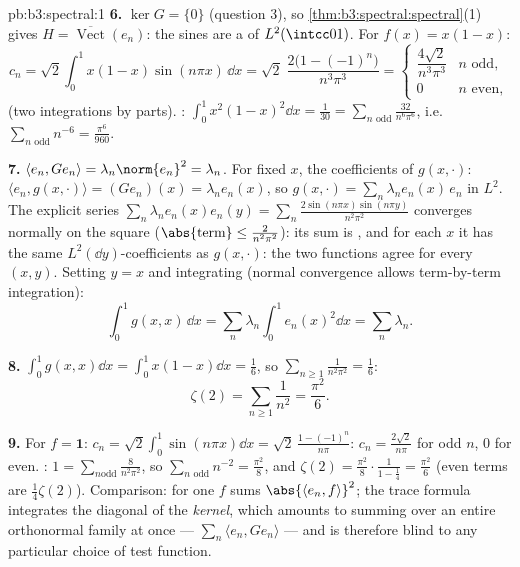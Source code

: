 \begin{solution}{pb:b3:spectral:1}
\textbf{6.} $\ker G = \{0\}$ (question 3), so
\cref{thm:b3:spectral:spectral}(1) gives $H =
\overline{\operatorname{Vect}}(e_n)$: the sines are a  of $L^2(\intcc01)$. For $f(x) = x(1 - x)$:
\[
c_n = \sqrt2\int_0^1x(1-x)\sin(n\pi x)\,\dd x
= \sqrt2\;\frac{2\bigl(1 - (-1)^n\bigr)}{n^3\pi^3}
= \begin{cases}\dfrac{4\sqrt2}{n^3\pi^3} & n \text{ odd},\\
0 & n \text{ even},\end{cases}
\]
(two integrations by parts). : $\int_0^1x^2(1-x)^2\dd
x = \frac1{30} = \sum_{n \text{ odd}}\frac{32}{n^6\pi^6}$,
i.e.\ $\sum_{n\text{ odd}}n^{-6} = \frac{\pi^6}{960}$.

\textbf{7.} $\langle e_n, Ge_n\rangle = \lambda_n\norm{e_n}^2
= \lambda_n$. For fixed $x$, the coefficients of $g(x,
\cdot)$: $\langle e_n, g(x,\cdot)\rangle = (Ge_n)(x) =
\lambda_ne_n(x)$, so $g(x,\cdot) =
\sum_n\lambda_ne_n(x)\,e_n$ in $L^2$. The explicit series
$\sum_n\lambda_ne_n(x)e_n(y) = \sum_n\frac{2\sin(n\pi
x)\sin(n\pi y)}{n^2\pi^2}$ converges normally on the square
($\abs{\text{term}} \leq \frac2{n^2\pi^2}$): its sum is
, and for each $x$ it has the same
$L^2(\dd y)$-coefficients as $g(x, \cdot)$: the two 
functions agree for every $(x, y)$. Setting $y = x$ and
integrating (normal convergence allows term-by-term
integration):
\[
\int_0^1g(x,x)\,\dd x =
\sum_n\lambda_n\int_0^1e_n(x)^2\dd x = \sum_n\lambda_n .
\]

\textbf{8.} $\int_0^1g(x,x)\dd x = \int_0^1x(1 - x)\dd x =
\frac16$, so $\sum_{n\geq1}\frac1{n^2\pi^2} = \frac16$:
\[
\zeta(2) = \sum_{n\geq1}\frac1{n^2} = \frac{\pi^2}6 .
\]

\textbf{9.} For $f = \mathbf 1$: $c_n =
\sqrt2\int_0^1\sin(n\pi x)\dd x = \sqrt2\,\frac{1 -
(-1)^n}{n\pi}$: $c_n = \frac{2\sqrt2}{n\pi}$ for odd $n$, $0$
for even. : $1 = \sum_{n\text{
odd}}\frac{8}{n^2\pi^2}$, so $\sum_{n\text{ odd}}n^{-2} =
\frac{\pi^2}8$, and $\zeta(2) = \frac{\pi^2}8\cdot\frac{1}{1
- \frac14} = \frac{\pi^2}6$ (even terms are $\frac14\zeta(2)$).
Comparison:  for one $f$ sums
$\abs{\langle e_n, f\rangle}^2$; the trace formula integrates
the diagonal of the \emph{kernel}, which amounts to summing
 over an entire orthonormal family at once ---
$\sum_n\langle e_n, Ge_n\rangle$ --- and is therefore blind to
any particular choice of test function.


\end{solution}
